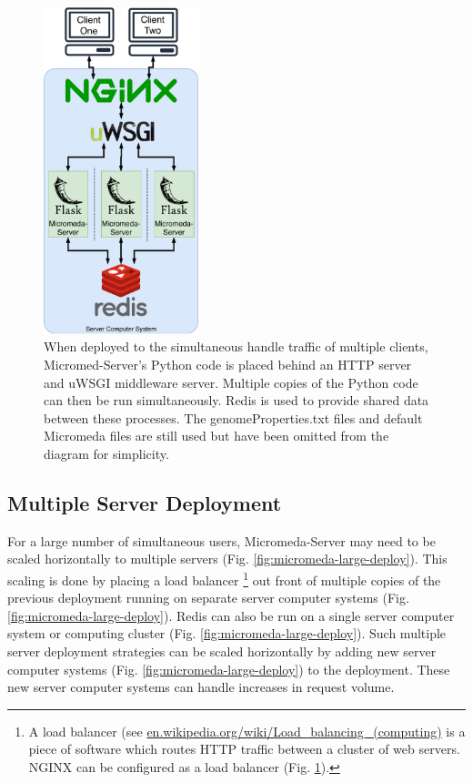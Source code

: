 \begin{figure}[!ht]
  \centering
	\includegraphics[width=0.40\textwidth]{media/micromeda-medium-deployment.pdf}
	 \caption{When deployed to the simultaneous handle traffic of multiple clients, Micromed-Server's Python code is placed behind an HTTP server and uWSGI middleware server. Multiple copies of the Python code can then be run simultaneously. Redis is used to provide shared data between these processes. The genomeProperties.txt files and default Micromeda files are still used but have been omitted from the diagram for simplicity.}
	 \label{fig:micromeda-medium-deploy}
\end{figure}

\subsection{Multiple Server Deployment} \label{multi-server-micromeda-deployment}

For a large number of simultaneous users, Micromeda-Server may need to be scaled horizontally to multiple servers (Fig. \ref{fig:micromeda-large-deploy}). This scaling is done by placing a load balancer \footnote{A load balancer (see \href{en.wikipedia.org/wiki/Load\_balancing\_(computing)}{en.wikipedia.org/wiki/Load\_balancing\_(computing)} is a piece of software which routes HTTP traffic between a cluster of web servers. NGINX  \cite{reese2008nginx} can be configured as a load balancer (Fig. \ref{fig:micromeda-medium-deploy}).} out front of multiple copies of the previous deployment running on separate server computer systems (Fig. \ref{fig:micromeda-large-deploy}). Redis can also be run on a single server computer system or computing cluster (Fig. \ref{fig:micromeda-large-deploy}). Such multiple server deployment strategies can be scaled horizontally by adding new server computer systems (Fig. \ref{fig:micromeda-large-deploy}) to the deployment. These new server computer systems can handle increases in request volume.

